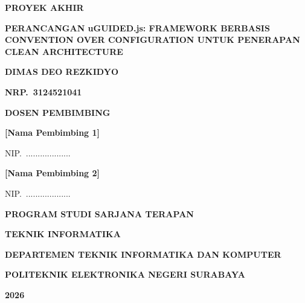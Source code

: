 \documentclass[12pt,a4paper,oneside]{report}
\begin{document}
\begin{titlepage}
    \centering
    {\large\bfseries PROYEK AKHIR\par}
    
    \vspace{2.5cm}
    {\Large\bfseries PERANCANGAN uGUIDED.js: FRAMEWORK BERBASIS CONVENTION OVER CONFIGURATION UNTUK PENERAPAN CLEAN ARCHITECTURE\par}
    
    \vspace{3cm}
    {\large\bfseries DIMAS DEO REZKIDYO\par}
    {\large\bfseries NRP.\ 3124521041\par}
    
    \vspace{2cm}
    {\bfseries DOSEN PEMBIMBING\par}
    \vspace{0.8cm}
    {\bfseries [Nama Pembimbing 1]\par}
    {NIP.\ ...................\par}
    \vspace{0.4cm}
    {\bfseries [Nama Pembimbing 2]\par}
    {NIP.\ ...................\par}
    
    \vfill
    {\bfseries PROGRAM STUDI SARJANA TERAPAN\par}
    {\bfseries TEKNIK INFORMATIKA\par}
    {\bfseries DEPARTEMEN TEKNIK INFORMATIKA DAN KOMPUTER\par}
    {\bfseries POLITEKNIK ELEKTRONIKA NEGERI SURABAYA\par}
    {\bfseries 2026\par}
\end{titlepage}

\setcounter{page}{3} %

\end{document}
